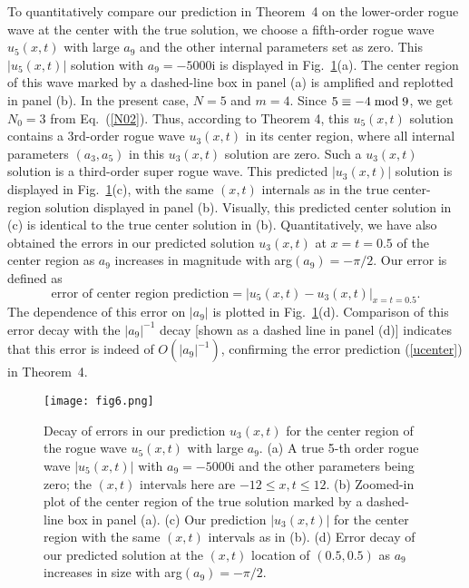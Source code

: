 \documentclass[amsmath,amssymb]{revtex4}
\begin{document}
To quantitatively compare our prediction in Theorem~4 on the lower-order rogue wave at the center with the true solution, we choose a fifth-order rogue wave $u_{5}(x,t)$ with large $a_{9}$ and the other internal parameters set as zero. This $|u_5(x,t)|$ solution with $a_{9}=-5000 \textrm{i}$ is displayed in Fig.~\ref{f:comcenter}(a). The center region of this wave marked by a dashed-line box in panel (a) is amplified and replotted in panel (b). In the present case, $N=5$ and $m=4$. Since $5\equiv -4 \hspace{0.1cm} \mbox{mod} \hspace{0.1cm} 9$, we get $N_0=3$ from Eq.~(\ref{N02}). Thus, according to Theorem 4, this $u_5(x,t)$ solution contains a 3rd-order rogue wave $u_3(x,t)$ in its center region, where all internal parameters $(a_3, a_5)$ in this $u_3(x,t)$ solution are zero. Such a $u_3(x,t)$ solution is a third-order super rogue wave. This predicted $|u_3(x,t)|$ solution is displayed in Fig.~\ref{f:comcenter}(c), with the same $(x,t)$ internals as in the true center-region solution displayed in panel (b). Visually, this predicted center solution in (c) is identical to the true center solution in (b). Quantitatively, we have also obtained the errors in our predicted solution $u_{3}(x,t)$ at $x=t=0.5$ of the center region as $a_9$ increases in magnitude with arg$(a_9)=-\pi /2$. Our error is defined as
\begin{equation*}
\mbox{error of center region prediction} = \left|u_5(x,t)-u_3(x,t)\right|_{x=t=0.5}.
\end{equation*}
The dependence of this error on $|a_9|$ is plotted in Fig.~\ref{f:comcenter}(d). Comparison of this error decay with the $|a_9|^{-1}$ decay [shown as a dashed line in panel (d)] indicates that this error is indeed of $O(|a_{9}|^{-1})$, confirming the error prediction (\ref{ucenter}) in Theorem~4.

\begin{figure}[htb]
\begin{center}
\texttt{[image: fig6.png]}
\caption{Decay of errors in our prediction $u_{3}(x,t)$ for the center region of the rogue wave $u_{5}(x,t)$ with large $a_{9}$. (a) A true 5-th order rogue wave $|u_{5}(x,t)|$ with $a_{9}=-5000 \textrm{i}$ and the other parameters being zero; the $(x,t)$ intervals here are $-12\le x, t \le 12$. (b) Zoomed-in plot of the center region of the true solution marked by a dashed-line box in panel (a). (c) Our prediction $|u_{3}(x,t)|$ for the center region with the same $(x,t)$ intervals as in (b). (d) Error decay of our predicted solution at the $(x,t)$ location of $(0.5, 0.5)$ as $a_9$ increases in size with arg$(a_9)=-\pi /2$.  } \label{f:comcenter}
\end{center}
\end{figure}
\end{document}
